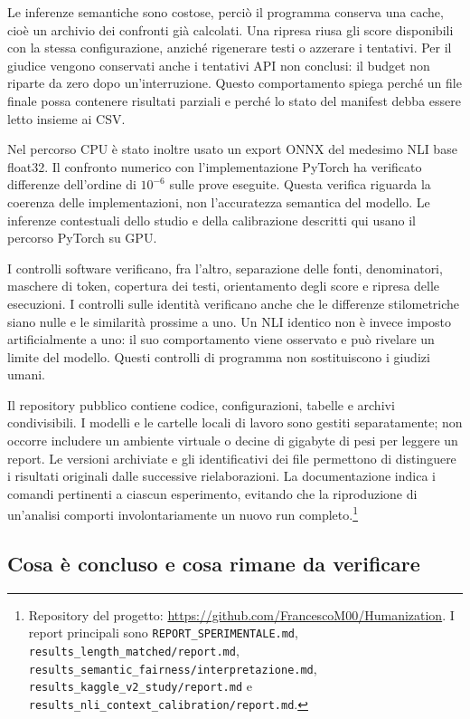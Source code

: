 \documentclass[11pt,a4paper]{article}
\begin{document}
Le inferenze semantiche sono costose, perciò il programma conserva una cache, cioè un archivio dei confronti già calcolati. Una ripresa riusa gli score disponibili con la stessa configurazione, anziché rigenerare testi o azzerare i tentativi. Per il giudice vengono conservati anche i tentativi API non conclusi: il budget non riparte da zero dopo un'interruzione. Questo comportamento spiega perché un file finale possa contenere risultati parziali e perché lo stato del manifest debba essere letto insieme ai CSV.

Nel percorso CPU è stato inoltre usato un export ONNX del medesimo NLI base float32. Il confronto numerico con l'implementazione PyTorch ha verificato differenze dell'ordine di \(10^{-6}\) sulle prove eseguite. Questa verifica riguarda la coerenza delle implementazioni, non l'accuratezza semantica del modello. Le inferenze contestuali dello studio e della calibrazione descritti qui usano il percorso PyTorch su GPU.

I controlli software verificano, fra l'altro, separazione delle fonti, denominatori, maschere di token, copertura dei testi, orientamento degli score e ripresa delle esecuzioni. I controlli sulle identità verificano anche che le differenze stilometriche siano nulle e le similarità prossime a uno. Un NLI identico non è invece imposto artificialmente a uno: il suo comportamento viene osservato e può rivelare un limite del modello. Questi controlli di programma non sostituiscono i giudizi umani.

Il repository pubblico contiene codice, configurazioni, tabelle e archivi condivisibili. I modelli e le cartelle locali di lavoro sono gestiti separatamente; non occorre includere un ambiente virtuale o decine di gigabyte di pesi per leggere un report. Le versioni archiviate e gli identificativi dei file permettono di distinguere i risultati originali dalle successive rielaborazioni. La documentazione indica i comandi pertinenti a ciascun esperimento, evitando che la riproduzione di un'analisi comporti involontariamente un nuovo run completo.\footnote{Repository del progetto: \url{https://github.com/FrancescoM00/Humanization}. I report principali sono \nolinkurl{REPORT_SPERIMENTALE.md}, \nolinkurl{results_length_matched/report.md}, \nolinkurl{results_semantic_fairness/interpretazione.md}, \nolinkurl{results_kaggle_v2_study/report.md} e \nolinkurl{results_nli_context_calibration/report.md}.}

\subsection{Cosa è concluso e cosa rimane da verificare}\label{cosa-uxe8-concluso-e-cosa-rimane-da-verificare}
\end{document}

